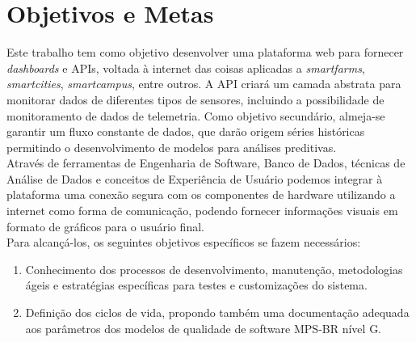 \documentclass[tcc-proposta]{texufpel}
\begin{document}
\chapter{Objetivos e Metas}
Este trabalho tem como objetivo desenvolver uma plataforma web para fornecer \textit{dashboards} e APIs, voltada à internet das coisas aplicadas a \textit{smartfarms}, \textit{smartcities}, \textit{smartcampus}, entre outros. A API criará um camada abstrata para monitorar dados de diferentes tipos de sensores, incluindo a possibilidade de monitoramento de dados de telemetria. Como objetivo secundário, almeja-se garantir um fluxo constante de dados, que darão origem séries históricas permitindo o desenvolvimento de modelos para análises preditivas. 
\\

Através de ferramentas de Engenharia de Software, Banco de Dados, técnicas de Análise de Dados e conceitos de Experiência de Usuário podemos integrar à plataforma uma conexão segura com os componentes de hardware utilizando a internet como forma de comunicação, podendo fornecer informações visuais em formato de gráficos para o usuário final.
\\

Para alcançá-los, os seguintes objetivos específicos se fazem necessários:
\begin{enumerate}

\item Conhecimento dos processos de desenvolvimento, manutenção, metodologias ágeis e estratégias específicas para testes e customizações do sistema.
\item Definição dos ciclos de vida, propondo também uma documentação adequada aos parâmetros dos modelos de qualidade de software MPS-BR nível G.
\end{enumerate}







\end{document}
